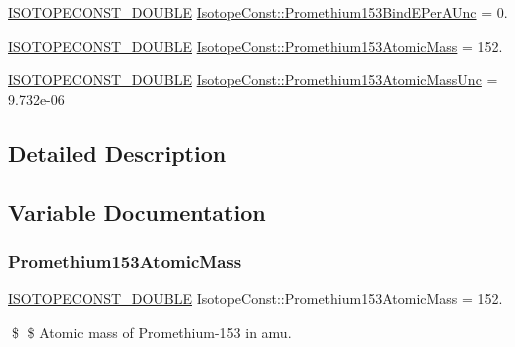 \begin{DoxyCompactItemize}
\item 
\mbox{\hyperlink{group___isotope_const-_macros_ga8f45a7272ce02c0b4c65c44636ed719a}{I\+S\+O\+T\+O\+P\+E\+C\+O\+N\+S\+T\+\_\+\+D\+O\+U\+B\+LE}} \mbox{\hyperlink{group___isotope_const-_promethium-_pm153_gaaecfcae06002b7ea1de392249bcc7e64}{Isotope\+Const\+::\+Promethium153\+Bind\+E\+Per\+A\+Unc}} = 0.
\item 
\mbox{\hyperlink{group___isotope_const-_macros_ga8f45a7272ce02c0b4c65c44636ed719a}{I\+S\+O\+T\+O\+P\+E\+C\+O\+N\+S\+T\+\_\+\+D\+O\+U\+B\+LE}} \mbox{\hyperlink{group___isotope_const-_promethium-_pm153_ga618437ce1d55ee8189d708decf2230a2}{Isotope\+Const\+::\+Promethium153\+Atomic\+Mass}} = 152.
\item 
\mbox{\hyperlink{group___isotope_const-_macros_ga8f45a7272ce02c0b4c65c44636ed719a}{I\+S\+O\+T\+O\+P\+E\+C\+O\+N\+S\+T\+\_\+\+D\+O\+U\+B\+LE}} \mbox{\hyperlink{group___isotope_const-_promethium-_pm153_ga8bd2fb463cc4b5c5f0a8581580654b57}{Isotope\+Const\+::\+Promethium153\+Atomic\+Mass\+Unc}} = 9.\+732e-\/06
\end{DoxyCompactItemize}


\subsection{Detailed Description}


\subsection{Variable Documentation}
\mbox{\label{group___isotope_const-_promethium-_pm153_ga618437ce1d55ee8189d708decf2230a2}} 
\subsubsection{\texorpdfstring{Promethium153\+Atomic\+Mass}{Promethium153AtomicMass}}
{\footnotesize\ttfamily \mbox{\hyperlink{group___isotope_const-_macros_ga8f45a7272ce02c0b4c65c44636ed719a}{I\+S\+O\+T\+O\+P\+E\+C\+O\+N\+S\+T\+\_\+\+D\+O\+U\+B\+LE}} Isotope\+Const\+::\+Promethium153\+Atomic\+Mass = 152.}

\$ \$ Atomic mass of Promethium-\/153 in amu. \mbox{\label{group___isotope_const-_promethium-_pm153_ga8bd2fb463cc4b5c5f0a8581580654b57}} 

